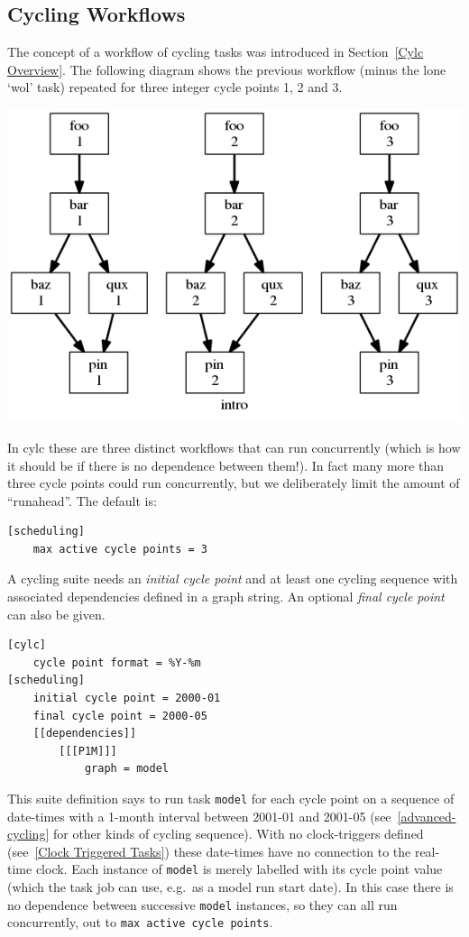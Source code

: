 \subsection{Cycling Workflows}

The concept of a workflow of cycling tasks was introduced in Section~\ref{Cylc
Overview}.  The following diagram shows the previous workflow (minus the lone
`wol' task) repeated for three integer cycle points 1, 2 and 3.

\begin{center}
\includegraphics[width=0.5\columnwidth]{resources/intro.png} %
\end{center}

In cylc these are three distinct workflows that can run concurrently (which is
how it should be if there is no dependence between them!). In fact many more
than three cycle points could run concurrently, but we deliberately limit the
amount of ``runahead''. The default is:
\begin{lstlisting}
[scheduling]
    max active cycle points = 3
\end{lstlisting}

A cycling suite needs an {\em initial cycle point} and at least one cycling
sequence with associated dependencies defined in a graph string. An optional
{\em final cycle point} can also be given.

\begin{lstlisting}[language=suiterc]
[cylc]
    cycle point format = %Y-%m
[scheduling]
    initial cycle point = 2000-01
    final cycle point = 2000-05
    [[dependencies]]
        [[[P1M]]]
            graph = model
\end{lstlisting}
This suite definition says to run task \lstinline=model= for each cycle point
on a sequence of date-times with a 1-month interval between 2001-01 and 2001-05 
(see~\ref{advanced-cycling} for other kinds of cycling sequence).
With no clock-triggers defined (see~\ref{Clock Triggered Tasks}) these
date-times have no connection to the real-time clock.  Each instance of
\lstinline=model= is merely labelled with its cycle point value (which the task
job can use, e.g.\ as a model run start date).  In this case
there is no dependence between successive \lstinline=model= instances, so they
can all run concurrently, out to \lstinline=max active cycle points=.

